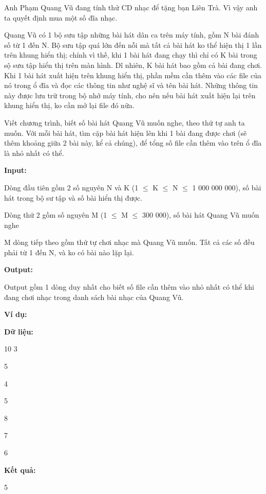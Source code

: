 



   Anh Phạm Quang Vũ đang tính thử CD nhạc để tặng bạn Liên Trà. Vì vậy anh ta quyết định mua một số đĩa nhạc.  

   Quang Vũ có 1 bộ sưu tập những bài hát dân ca trên máy tính, gồm N bài đánh số từ 1 đến N. Bộ sưu tập quá lớn đến nỗi mà tất cả bài hát ko thể hiện thị 1 lần trên khung hiển thị; chính vì thế, khi 1 bài hát đang chạy thì chỉ có K bài trong sộ sưu tập hiển thị trên màn hình. Dĩ nhiên, K bài hát bao gồm cả bài đang chơi. Khi 1 bài hát xuất hiện trên khung hiển thị, phần mềm cần thêm vào các file của nó trong ổ đĩa và đọc các thông tin như nghệ sĩ và tên bài hát. Những thông tin này được lưu trữ trong bộ nhớ máy tính, cho nên nếu bài hát xuất hiện lại trên khung hiển thị, ko cần mở lại file đó nữa.  

   Viết chương trình, biết số bài hát Quang Vũ muốn nghe, theo thứ tự anh ta muốn. Với mỗi bài hát, tìm cặp bài hát hiện lên khi 1 bài đang được chơi (sẽ thêm khoảng giữa 2 bài này, kể cả chúng), để tổng số file cần thêm vào trên ổ đĩa là nhỏ nhất có thể.  



\textbf{    Input:   }

   Dòng đầu tiên gồm 2 số nguyên N và K (1  $\le$  K  $\le$  N  $\le$  1 000 000 000), số bài hát trong bộ sư tập và số bài hiển thị được.  

   Dòng thứ 2 gồm số nguyên M (1  $\le$  M  $\le$  300 000), số bài hát Quang Vũ muốn nghe  

   M dòng tiếp theo gồm thứ tự chơi nhạc mà Quang Vũ muốn. Tất cả các số đều phải từ 1 đến N, và ko có bài nào lặp lại.  



\textbf{    Output:   }

   Output gồm 1 dòng duy nhất cho biết số file cần thêm vào nhỏ nhất có thể khi đang chơi nhạc trong danh sách bài nhạc của Quang Vũ.  

\textbf{    Ví dụ:   }



\textbf{    Dữ liệu:   }

   10 3   


   5   


   4   


   5   


   8   


   7   


   6  



\textbf{    Kết quả:   }

   5  





